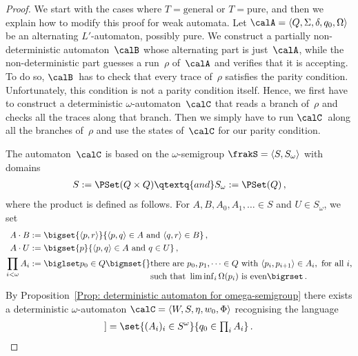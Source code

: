\documentclass[10pt, fleqn]{scrartcl}
\newcommand*{\?}{\kern .08em}
\newcommand\lsem{[\![}
\newcommand\rsem{]\!]}
\begin{document}
\begin{proof}
We start with the cases where $T = \mathrm{general}$ or $T = \mathrm{pure}$,
and then we explain how to modify this proof for weak automata.
Let $\calA = \langle Q,\Sigma,\delta,q_0,\Omega\rangle$ be an alternating $L'$-automaton,
possibly pure.
We construct a partially non-deterministic automaton~$\calB$ whose alternating part is
just~$\calA$, while the non-deterministic part guesses a run~$\rho$ of~$\calA$ and
verifies that it is accepting. To do so, $\calB$~has to check that every trace of~$\rho$
satisfies the parity condition. Unfortunately, this condition is not a parity condition
itself. Hence, we first have to construct a deterministic $\omega$-automaton~$\calC$
that reads a branch of~$\rho$ and checks all the traces along that branch.
Then we simply have to run $\calC$~along all the branches of~$\rho$ and
use the states of~$\calC$ for our parity condition.

The automaton~$\calC$ is based on the $\omega$-semigroup $\frakS = \langle S,S_\omega\rangle$
with domains
\begin{align*}
  S := \PSet(Q \times Q)
  \qtextq{and}
  S_\omega := \PSet(Q)\,,
\end{align*}
where the product is defined as follows.
For $A,B,A_0,A_1,\ldots \in S$ and $U \in S_\omega$, we set
\begin{align*}
  A\cdot B &:= \bigset{ \langle p,r\rangle }
                      { \langle p,q\rangle \in A \text{ and } \langle q,r\rangle \in B }\,, \\
  A\cdot U &:= \bigset{ p }{ \langle p,q\rangle \in A \text{ and } q \in U }\,, \\
  \prod_{i<\omega} A_i &:=
    \begin{aligned}[t]
      \biglset p_0 \in Q \bigmset {}
        & \text{there are } p_0,p_1,\dots \in Q \text{ with }
          \langle p_i,p_{i+1}\rangle \in A_i, \text{ for all } i, \\
        & \text{such that } \liminf\nolimits_i \Omega(p_i) \text{ is even} \bigrset\,.
    \end{aligned}
\end{align*}
By Proposition~\ref{Prop: deterministic automaton for omega-semigroup}
there exists a deterministic $\omega$-automaton
$\calC = \langle W,S,\eta,w_0,\Phi\rangle$
recognising the language
\begin{align*}
  \lsem\calC\rsem = \set{ (A_i)_i \in S^\omega }{ q_0 \in \textstyle\prod_i A_i }\,.
\end{align*}


\end{proof}
\end{document}
